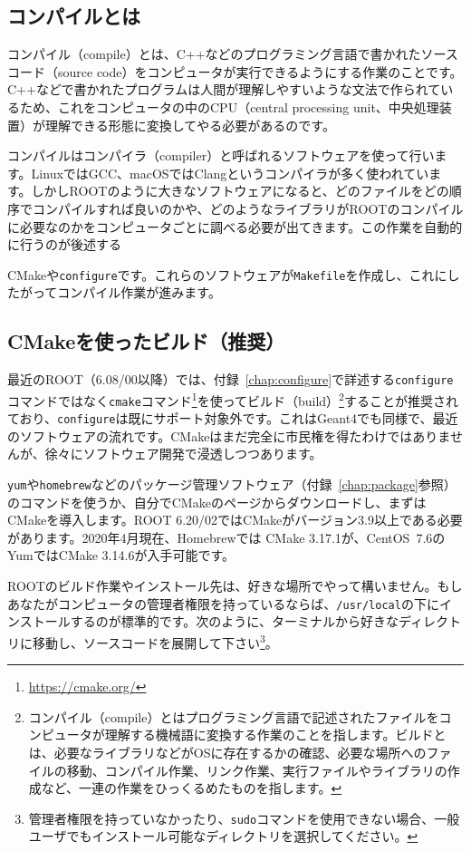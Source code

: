 \subsection{コンパイルとは}
コンパイル（compile）とは、C++などのプログラミング言語で書かれたソースコード（source code）をコンピュータが実行できるようにする作業のことです。C++などで書かれたプログラムは人間が理解しやすいような文法で作られているため、これをコンピュータの中のCPU（central processing unit、中央処理装置）が理解できる形態に変換してやる必要があるのです。

コンパイルはコンパイラ（compiler）と呼ばれるソフトウェアを使って行います。LinuxではGCC、macOSではClangというコンパイラが多く使われています。しかしROOTのように大きなソフトウェアになると、どのファイルをどの順序でコンパイルすれば良いのかや、どのようなライブラリがROOTのコンパイルに必要なのかをコンピュータごとに調べる必要が出てきます。この作業を自動的に行うのが後述する{CMakeや\texttt{configure}です。これらのソフトウェアが\texttt{Makefile}を作成し、これにしたがってコンパイル作業が進みます。

\subsection{CMakeを使ったビルド（推奨）}
\label{subsec:compile_cmake}
最近のROOT（6.08/00以降）では、付録~\ref{chap:configure}で詳述する\texttt{configure}コマンドではなく\texttt{cmake}コマンド\footnote{\url{https://cmake.org/}}を使ってビルド（build）\footnote{コンパイル（compile）とはプログラミング言語で記述されたファイルをコンピュータが理解する機械語に変換する作業のことを指します。ビルドとは、必要なライブラリなどがOSに存在するかの確認、必要な場所へのファイルの移動、コンパイル作業、リンク作業、実行ファイルやライブラリの作成など、一連の作業をひっくるめたものを指します。}することが推奨されており、\texttt{configure}は既にサポート対象外です。これはGeant4でも同様で、最近のソフトウェアの流れです。CMakeはまだ完全に市民権を得たわけではありませんが、徐々にソフトウェア開発で浸透しつつあります。

\texttt{yum}や\texttt{homebrew}などのパッケージ管理ソフトウェア（付録~\ref{chap:package}参照）のコマンドを使うか、自分でCMakeのページからダウンロードし、まずはCMakeを導入します。ROOT 6.20/02ではCMakeがバージョン3.9以上である必要があります。2020年4月現在、Homebrewでは CMake 3.17.1が、CentOS~7.6のYumではCMake 3.14.6が入手可能です。

ROOTのビルド作業やインストール先は、好きな場所でやって構いません。もしあなたがコンピュータの管理者権限を持っているならば、\texttt{/usr/local}の下にインストールするのが標準的です。次のように、ターミナルから好きなディレクトリに移動し、ソースコードを展開して下さい\footnote{管理者権限を持っていなかったり、\texttt{sudo}コマンドを使用できない場合、一般ユーザでもインストール可能なディレクトリを選択してください。}。

}
